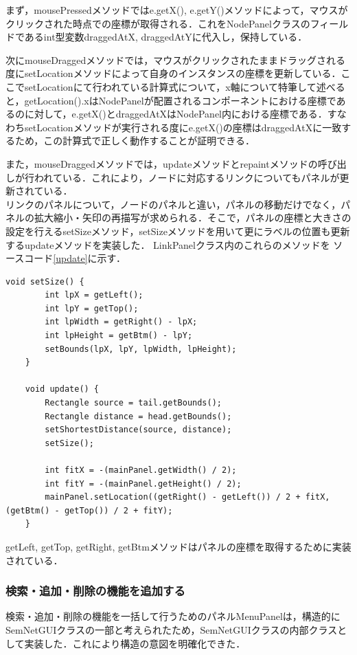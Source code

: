 \documentclass[12pt]{jarticle}
\begin{document}
まず，mousePressedメソッドではe.getX(), e.getY()メソッドによって，マウスがクリックされた時点での座標が取得される．これをNodePanelクラスのフィールドであるint型変数draggedAtX,  draggedAtYに代入し，保持している．

次にmouseDraggedメソッドでは，マウスがクリックされたままドラッグされる度にsetLocationメソッドによって自身のインスタンスの座標を更新している．ここでsetLocationにて行われている計算式について，x軸について特筆して述べると，getLocation().xはNodePanelが配置されるコンポーネントにおける座標であるのに対して，e.getX()とdraggedAtXはNodePanel内における座標である．すなわちsetLocationメソッドが実行される度にe.getX()の座標はdraggedAtXに一致するため，この計算式で正しく動作することが証明できる．

また，mouseDraggedメソッドでは，updateメソッドとrepaintメソッドの呼び出しが行われている．これにより，ノードに対応するリンクについてもパネルが更新されている． \\

リンクのパネルについて，ノードのパネルと違い，パネルの移動だけでなく，パネルの拡大縮小・矢印の再描写が求められる．そこで，パネルの座標と大きさの設定を行えるsetSizeメソッド，setSizeメソッドを用いて更にラベルの位置も更新するupdateメソッドを実装した．
LinkPanelクラス内のこれらのメソッドを
ソースコード\ref{update}に示す．

\begin{lstlisting}[caption=setSizeメソッド・updateメソッド, label=update]
    void setSize() {
        int lpX = getLeft();
        int lpY = getTop();
        int lpWidth = getRight() - lpX;
        int lpHeight = getBtm() - lpY;
        setBounds(lpX, lpY, lpWidth, lpHeight);
    }

    void update() {
        Rectangle source = tail.getBounds();
        Rectangle distance = head.getBounds();
        setShortestDistance(source, distance);
        setSize();

        int fitX = -(mainPanel.getWidth() / 2);
        int fitY = -(mainPanel.getHeight() / 2);
        mainPanel.setLocation((getRight() - getLeft()) / 2 + fitX, (getBtm() - getTop()) / 2 + fitY);
    }
\end{lstlisting}

getLeft, getTop, getRight, getBtmメソッドはパネルの座標を取得するために実装されている．

\subsubsection{検索・追加・削除の機能を追加する}
検索・追加・削除の機能を一括して行うためのパネルMenuPanelは，構造的にSemNetGUIクラスの一部と考えられたため，SemNetGUIクラスの内部クラスとして実装した．これにより構造の意図を明確化できた．
\end{document}
